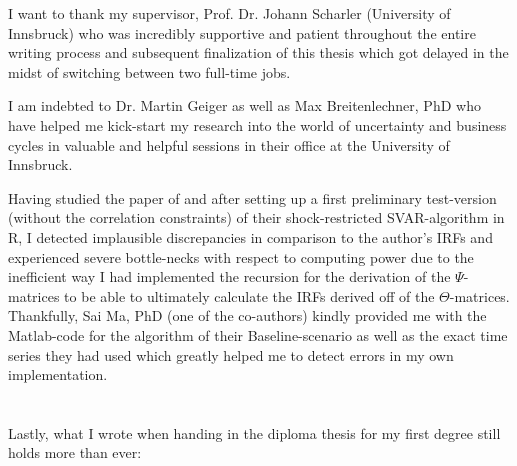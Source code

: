 \documentclass[a4paper,11pt,listof=nochaptergap,oneside,pointednumbers,bibtotoc,bigheadings,liststotoc,hidelinks]{scrbook}
\theoremstyle{mysatz}
\theoremstyle{mydefinition}
\theoremstyle{mytheorem}
\theoremstyle{mybemerkung}
\begin{document}


\newpage
\thispagestyle{empty} %


\vspace*{40px}
I want to thank my supervisor, Prof. Dr. Johann Scharler (University of Innsbruck) who was incredibly supportive and patient throughout the entire writing process and subsequent finalization of this thesis which got delayed in the midst of switching between two full-time jobs.

I am indebted to Dr. Martin Geiger as well as Max Breitenlechner, PhD who have helped me kick-start my research into the world of uncertainty and business cycles in valuable and helpful sessions in their office at the University of Innsbruck. 

Having studied the paper of \citet{ludvigsonetal:18} and after setting up a first preliminary test-version (without the correlation constraints) of their shock-restricted SVAR-algorithm in R, I detected implausible discrepancies in comparison to the author's IRFs and experienced severe bottle-necks with respect to computing power due to the inefficient way I had implemented the recursion for the derivation of the $\Psi$-matrices to be able to ultimately calculate the IRFs derived off of the $\Theta$-matrices. Thankfully, Sai Ma, PhD (one of the co-authors) kindly provided me with the Matlab-code for the algorithm of their Baseline-scenario as well as the exact time series they had used which greatly helped me to detect errors in my own implementation.\\
\\
\\
Lastly, what I wrote when handing in the diploma thesis for my first degree still holds more than ever:
\end{document}
